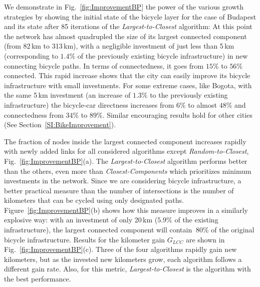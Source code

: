 We demonstrate in Fig.~\ref{fig:ImprovementBP} the power of the various growth strategies by showing the initial state of the bicycle layer for the case of Budapest and its state after 85 iterations of the \emph{Largest-to-Closest} algorithm: At this point the network has almost quadrupled the size of its largest connected component (from 82\,km to 313\,km), with a negligible investment of just less than 5\,km (corresponding to $1.4\%$ of the previously existing bicycle infrastructure) in new connecting bicycle paths. In terms of connectedness, it goes from $15\%$ to $56\%$ connected. This rapid increase shows that the city can easily improve its bicycle infrastructure with small investments. For some extreme cases, like Bogota, with the same 5\,km investment (an increase of $1.3\%$ to the previously existing infrastructure) the bicycle-car directness increases from $6\%$ to almost $48\%$ and connectedness from $34\%$ to $89\%$. Similar encouraging results hold for other cities (See Section~\ref{SI:BikeImprovement}).

The fraction of nodes inside the largest connected component increases rapidly with newly added links for all considered algorithms except \emph{Random-to-Closest}, Fig.~\ref{fig:ImprovementBP}(a). The \emph{Largest-to-Closest} algorithm performs better than the others, even more than \emph{Closest-Components} which prioritizes minimum investments in the network. Since we are considering bicycle infrastructure, a better practical measure than the number of intersections is the number of kilometers that can be cycled using only designated paths. Figure~\ref{fig:ImprovementBP}(b) shows how this measure improves in a similarly explosive way: with an investment of only 20\,km ($5.9\%$ of the existing infrastructure), the largest connected component will contain $~80\%$ of the original bicycle infrastructure. Results for the kilometer gain $G_{LCC}$ are shown in Fig.~\ref{fig:ImprovementBP}(c). Three of the four algorithms rapidly gain new kilometers, but as the invested new kilometers grow, each algorithm follows a different gain rate. Also, for this metric, \textit{Largest-to-Closest} is the algorithm with the best performance.

